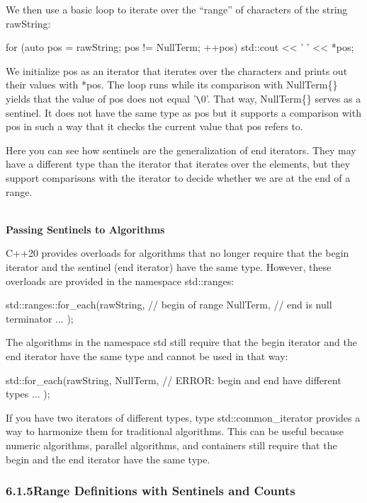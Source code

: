 We then use a basic loop to iterate over the “range” of characters of the string rawString:

\begin{cpp}
for (auto pos = rawString; pos != NullTerm{}; ++pos) {
	std::cout << ' ' << *pos;
}
\end{cpp}

We initialize pos as an iterator that iterates over the characters and prints out their values with *pos. The loop runs while its comparison with NullTerm\{\} yields that the value of pos does not equal ’\verb|\|0’. That way, NullTerm\{\} serves as a sentinel. It does not have the same type as pos but it supports a comparison with pos in such a way that it checks the current value that pos refers to.

Here you can see how sentinels are the generalization of end iterators. They may have a different type than the iterator that iterates over the elements, but they support comparisons with the iterator to decide whether we are at the end of a range.

\noindent
\hspace*{\fill} \\ %
\textbf{Passing Sentinels to Algorithms}

C++20 provides overloads for algorithms that no longer require that the begin iterator and the sentinel (end iterator) have the same type. However, these overloads are provided in the namespace std::ranges:

\begin{cpp}
std::ranges::for_each(rawString, // begin of range
						NullTerm{}, // end is null terminator
						... );
\end{cpp}

The algorithms in the namespace std still require that the begin iterator and the end iterator have the same type and cannot be used in that way:

\begin{cpp}
std::for_each(rawString, NullTerm{}, // ERROR: begin and end have different types
			... );
\end{cpp}

If you have two iterators of different types, type std::common\_iterator provides a way to harmonize them for traditional algorithms. This can be useful because numeric algorithms, parallel algorithms, and containers still require that the begin and the end iterator have the same type.

\subsubsection*{ 6.1.5\hspace{0.2cm}Range Definitions with Sentinels and Counts}

